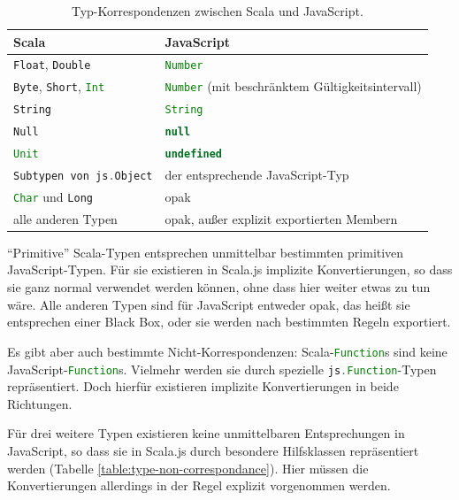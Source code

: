 \documentclass[a4paper, 12pt, hidelinks, listof=totoc, listoftables=totoc, bibliography=totoc]{scrreprt}
\newcommand{\scala}[1]{\lstinline[language=Scala, style=inline]|#1|}
\newcommand{\js}[1]{\lstinline[language=JavaScript, style=inline]|#1|}
\begin{document}
\begin{table}[!h]
\begin{tabular}{|l|l|}
\hline \textbf{Scala}                           & \textbf{JavaScript} \\ 
\hline \scala{Float}, \scala{Double}            & \js{Number} \\ 
\hline \scala{Byte}, \scala{Short}, \scala{Int} & \js{Number} (mit beschränktem Gültigkeitsintervall) \\ 
\hline \scala{String}                           & \js{String} \\ 
\hline \scala{Null}                             & \js{null} \\ 
\hline \scala{Unit}                             & \js{undefined} \\ 
\hline \scala{Subtypen von js.Object}           & der entsprechende JavaScript-Typ \\ 
\hline \scala{Char} und \scala{Long}            & opak \\ 
\hline alle anderen Typen                       & opak, außer explizit exportierten Membern \\ 
\hline 
\end{tabular}
\caption{Typ-Korrespondenzen zwischen Scala und JavaScript. \cite[S. 13]{doeraene2014.WHB}}
\label{table:type-correspondance}
\end{table}

\medskip

"`Primitive"' Scala-Typen entsprechen unmittelbar bestimmten primitiven JavaScript-Typen. Für sie existieren in Scala.js implizite Konvertierungen, so dass sie ganz normal verwendet werden können, ohne dass hier weiter etwas zu tun wäre. Alle anderen Typen sind für JavaScript entweder opak, das heißt sie entsprechen einer Black Box, oder sie werden nach bestimmten Regeln exportiert.

Es gibt aber auch bestimmte Nicht-Korrespondenzen: Scala-\scala{Function}s sind keine JavaScript-\js{Function}s. Vielmehr werden sie durch spezielle \scala{js.Function}-Typen repräsentiert. Doch hierfür existieren implizite Konvertierungen in beide Richtungen.

Für drei weitere Typen existieren keine unmittelbaren Entsprechungen in JavaScript, so dass sie in Scala.js durch besondere Hilfsklassen repräsentiert werden (Tabelle \ref{table:type-non-correspondance}). Hier müssen die Konvertierungen allerdings in der Regel explizit vorgenommen werden.

\medskip
\end{document}
